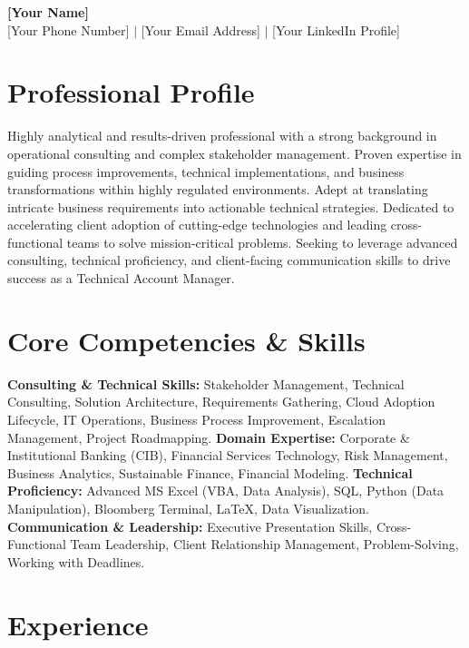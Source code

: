 \documentclass{article}
\begin{document}
\begin{center}
    \textbf{\Huge [Your Name]} \\
    \normalsize [Your Phone Number] $|$ [Your Email Address] $|$ [Your LinkedIn Profile]
\end{center}

\section{Professional Profile}
Highly analytical and results-driven professional with a strong background in operational consulting and complex stakeholder management. Proven expertise in guiding process improvements, technical implementations, and business transformations within highly regulated environments. Adept at translating intricate business requirements into actionable technical strategies. Dedicated to accelerating client adoption of cutting-edge technologies and leading cross-functional teams to solve mission-critical problems. Seeking to leverage advanced consulting, technical proficiency, and client-facing communication skills to drive success as a Technical Account Manager.

\section{Core Competencies \& Skills}
\textbf{Consulting \& Technical Skills:} Stakeholder Management, Technical Consulting, Solution Architecture, Requirements Gathering, Cloud Adoption Lifecycle, IT Operations, Business Process Improvement, Escalation Management, Project Roadmapping.
\textbf{Domain Expertise:} Corporate \& Institutional Banking (CIB), Financial Services Technology, Risk Management, Business Analytics, Sustainable Finance, Financial Modeling.
\textbf{Technical Proficiency:} Advanced MS Excel (VBA, Data Analysis), SQL, Python (Data Manipulation), Bloomberg Terminal, LaTeX, Data Visualization.
\textbf{Communication \& Leadership:} Executive Presentation Skills, Cross-Functional Team Leadership, Client Relationship Management, Problem-Solving, Working with Deadlines.

\section{Experience}
\end{document}
